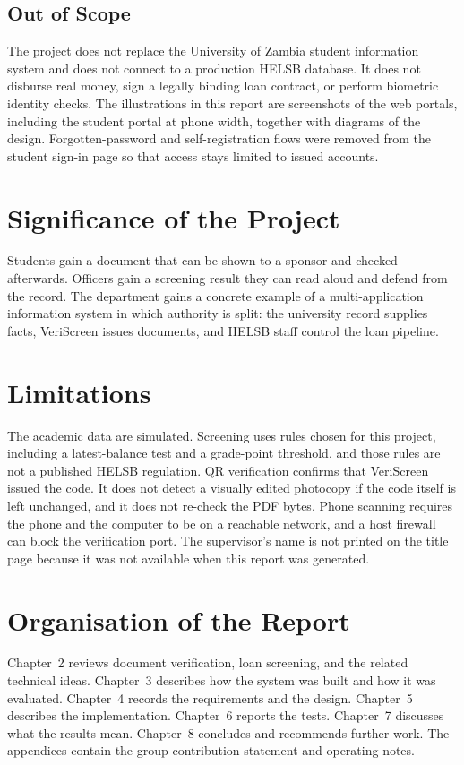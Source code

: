 \documentclass[12pt,a4paper]{report}
\begin{document}
\subsection{Out of Scope}
The project does not replace the University of Zambia student information system and does not connect to a production HELSB database. It does not disburse real money, sign a legally binding loan contract, or perform biometric identity checks. The illustrations in this report are screenshots of the web portals, including the student portal at phone width, together with diagrams of the design. Forgotten-password and self-registration flows were removed from the student sign-in page so that access stays limited to issued accounts.

\section{Significance of the Project}
Students gain a document that can be shown to a sponsor and checked afterwards. Officers gain a screening result they can read aloud and defend from the record. The department gains a concrete example of a multi-application information system in which authority is split: the university record supplies facts, VeriScreen issues documents, and HELSB staff control the loan pipeline.

\section{Limitations}
The academic data are simulated. Screening uses rules chosen for this project, including a latest-balance test and a grade-point threshold, and those rules are not a published HELSB regulation. QR verification confirms that VeriScreen issued the code. It does not detect a visually edited photocopy if the code itself is left unchanged, and it does not re-check the PDF bytes. Phone scanning requires the phone and the computer to be on a reachable network, and a host firewall can block the verification port. The supervisor's name is not printed on the title page because it was not available when this report was generated.

\section{Organisation of the Report}
Chapter~2 reviews document verification, loan screening, and the related technical ideas. Chapter~3 describes how the system was built and how it was evaluated. Chapter~4 records the requirements and the design. Chapter~5 describes the implementation. Chapter~6 reports the tests. Chapter~7 discusses what the results mean. Chapter~8 concludes and recommends further work. The appendices contain the group contribution statement and operating notes.
\end{document}
